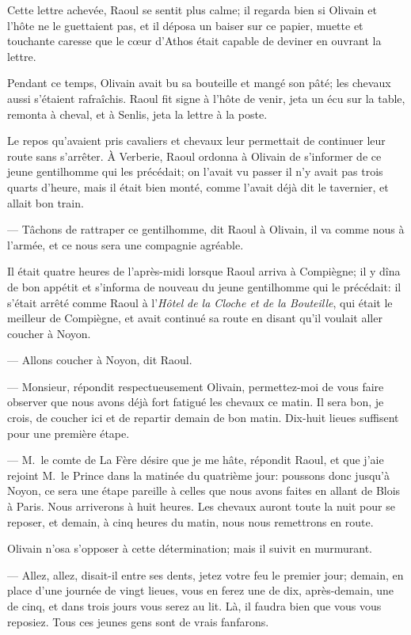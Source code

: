 Cette lettre achevée, Raoul se sentit plus calme; il regarda bien si Olivain et l'hôte ne le guettaient pas, et il déposa un baiser sur ce papier, muette et touchante caresse que le cœur d'Athos était capable de deviner en ouvrant la lettre.

Pendant ce temps, Olivain avait bu sa bouteille et mangé son pâté; les chevaux aussi s'étaient rafraîchis. Raoul fit signe à l'hôte de venir, jeta un écu sur la table, remonta à cheval, et à Senlis, jeta la lettre à la poste.

Le repos qu'avaient pris cavaliers et chevaux leur permettait de continuer leur route sans s'arrêter. À Verberie, Raoul ordonna à Olivain de s'informer de ce jeune gentilhomme qui les précédait; on l'avait vu passer il n'y avait pas trois quarts d'heure, mais il était bien monté, comme l'avait déjà dit le tavernier, et allait bon train.

— Tâchons de rattraper ce gentilhomme, dit Raoul à Olivain, il va comme nous à l'armée, et ce nous sera une compagnie agréable.

Il était quatre heures de l'après-midi lorsque Raoul arriva à Compiègne; il y dîna de bon appétit et s'informa de nouveau du jeune gentilhomme qui le précédait: il s'était arrêté comme Raoul à l'\textit{Hôtel} \textit{de la Cloche et de la Bouteille}, qui était le meilleur de Compiègne, et avait continué sa route en disant qu'il voulait aller coucher à Noyon.

— Allons coucher à Noyon, dit Raoul.

— Monsieur, répondit respectueusement Olivain, permettez-moi de vous faire observer que nous avons déjà fort fatigué les chevaux ce matin. Il sera bon, je crois, de coucher ici et de repartir demain de bon matin. Dix-huit lieues suffisent pour une première étape.

— M.~le comte de La Fère désire que je me hâte, répondit Raoul, et que j'aie rejoint M.~le Prince dans la matinée du quatrième jour: poussons donc jusqu'à Noyon, ce sera une étape pareille à celles que nous avons faites en allant de Blois à Paris. Nous arriverons à huit heures. Les chevaux auront toute la nuit pour se reposer, et demain, à cinq heures du matin, nous nous remettrons en route.

Olivain n'osa s'opposer à cette détermination; mais il suivit en murmurant.

— Allez, allez, disait-il entre ses dents, jetez votre feu le premier jour; demain, en place d'une journée de vingt lieues, vous en ferez une de dix, après-demain, une de cinq, et dans trois jours vous serez au lit. Là, il faudra bien que vous vous reposiez. Tous ces jeunes gens sont de vrais fanfarons.

